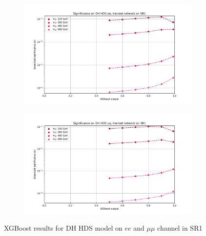 \documentclass[12pt, a4paper]{book}
\begin{document}
\begin{figure}[!ht]
\begin{subfigure}[b]{0.49\textwidth}
      \includegraphics[width=1\textwidth]{XGBoost/Model_independent/50-100/DH_HDS/EXP_SIG_ee.pdf}
   \end{subfigure}
   \hfill
   \begin{subfigure}[b]{0.49\textwidth}
      \centering
      \includegraphics[width=1\textwidth]{XGBoost/Model_independent/50-100/DH_HDS/EXP_SIG_uu.pdf}
   \end{subfigure}
   \caption{XGBoost results for DH HDS model on $ee$ and $\mu\mu$ channel in SR1}\label{fig:DH_HDS_SR1}
\end{figure}
\end{document}
